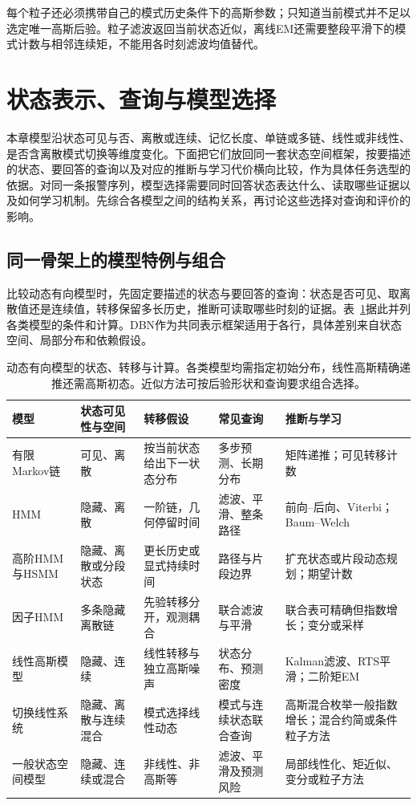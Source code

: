 每个粒子还必须携带自己的模式历史条件下的高斯参数；只知道当前模式并不足以选定唯一高斯后验。粒子滤波返回当前状态近似，离线EM还需要整段平滑下的模式计数与相邻连续矩，不能用各时刻滤波均值替代。

\section{状态表示、查询与模型选择}
\label{sec:pgm-dynamic-comparison}

本章模型沿状态可见与否、离散或连续、记忆长度、单链或多链、线性或非线性、是否含离散模式切换等维度变化。下面把它们放回同一套状态空间框架，按要描述的状态、要回答的查询以及对应的推断与学习代价横向比较，作为具体任务选型的依据。对同一条报警序列，模型选择需要同时回答状态表达什么、读取哪些证据以及如何学习机制。先综合各模型之间的结构关系，再讨论这些选择对查询和评价的影响。

\subsection{同一骨架上的模型特例与组合}
\label{sec:pgm-dynamic-model-relations}

比较动态有向模型时，先固定要描述的状态与要回答的查询：状态是否可见、取离散值还是连续值，转移保留多长历史，推断可读取哪些时刻的证据。表~\ref{tab:pgm-dynamic-models}据此并列各类模型的条件和计算。DBN作为共同表示框架适用于各行，具体差别来自状态空间、局部分布和依赖假设。

\begin{table}[htbp]
  \centering
  \small
  \begin{tabularx}{\linewidth}{@{}p{25mm}p{23mm}p{29mm}p{27mm}X@{}}
    \toprule
    模型 & 状态可见性与空间 & 转移假设 & 常见查询 & 推断与学习 \\
    \midrule
    有限Markov链 & 可见、离散 & 按当前状态给出下一状态分布 & 多步预测、长期分布 & 矩阵递推；可见转移计数 \\
    HMM & 隐藏、离散 & 一阶链，几何停留时间 & 滤波、平滑、整条路径 & 前向--后向、Viterbi；Baum--Welch \\
    高阶HMM与HSMM & 隐藏、离散或分段状态 & 更长历史或显式持续时间 & 路径与片段边界 & 扩充状态或片段动态规划；期望计数 \\
    因子HMM & 多条隐藏离散链 & 先验转移分开，观测耦合 & 联合滤波与平滑 & 联合表可精确但指数增长；变分或采样 \\
    线性高斯模型 & 隐藏、连续 & 线性转移与独立高斯噪声 & 状态分布、预测密度 & Kalman滤波、RTS平滑；二阶矩EM \\
    切换线性系统 & 隐藏、离散与连续混合 & 模式选择线性动态 & 模式与连续状态联合查询 & 高斯混合枚举一般指数增长；混合约简或条件粒子方法 \\
    一般状态空间模型 & 隐藏、连续或混合 & 非线性、非高斯等 & 滤波、平滑及预测风险 & 局部线性化、矩近似、变分或粒子方法 \\
    \bottomrule
  \end{tabularx}
  \caption{动态有向模型的状态、转移与计算。各类模型均需指定初始分布，线性高斯精确递推还需高斯初态。近似方法可按后验形状和查询要求组合选择。}
  \label{tab:pgm-dynamic-models}
\end{table}

